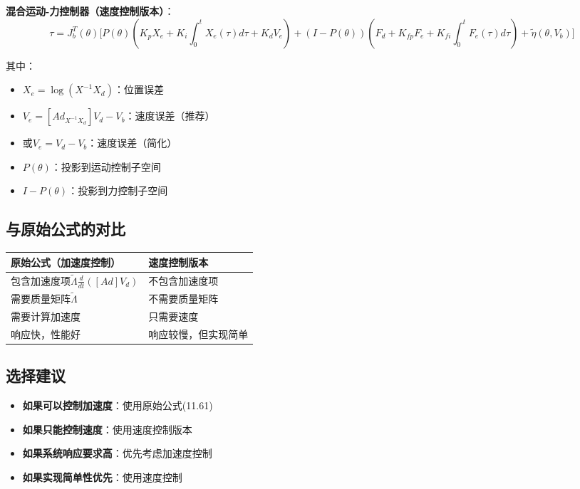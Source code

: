 \documentclass[12pt,a4paper]{article}
\begin{document}
\textbf{混合运动-力控制器（速度控制版本）}：
\begin{equation}
\tau = J_b^T(\theta)\Bigg[P(\theta)\left(K_p X_e + K_i\int_0^t X_e(\tau)d\tau + K_d V_e\right) + (I - P(\theta))\left(F_d + K_{fp}F_e + K_{fi}\int_0^t F_e(\tau)d\tau\right) + \tilde{\eta}(\theta, V_b)\Bigg]
\end{equation}

其中：
\begin{itemize}
\item $X_e = \log(X^{-1}X_d)$：位置误差
\item $V_e = [Ad_{X^{-1}X_d}]V_d - V_b$：速度误差（推荐）
\item 或$V_e = V_d - V_b$：速度误差（简化）
\item $P(\theta)$：投影到运动控制子空间
\item $I - P(\theta)$：投影到力控制子空间
\end{itemize}

\subsection{与原始公式的对比}

\begin{center}
\begin{tabular}{|l|l|}
\hline
\textbf{原始公式（加速度控制）} & \textbf{速度控制版本} \\
\hline
包含加速度项$\tilde{\Lambda}\frac{d}{dt}([Ad]V_d)$ & 不包含加速度项 \\
需要质量矩阵$\tilde{\Lambda}$ & 不需要质量矩阵 \\
需要计算加速度 & 只需要速度 \\
响应快，性能好 & 响应较慢，但实现简单 \\
\hline
\end{tabular}
\end{center}

\subsection{选择建议}

\begin{itemize}
\item \textbf{如果可以控制加速度}：使用原始公式(11.61)
\item \textbf{如果只能控制速度}：使用速度控制版本
\item \textbf{如果系统响应要求高}：优先考虑加速度控制
\item \textbf{如果实现简单性优先}：使用速度控制
\end{itemize}
\end{document}
